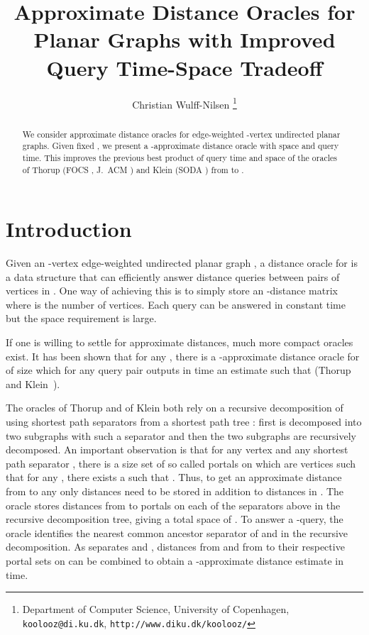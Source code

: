 \documentclass[11pt]{article}
\begin{document}
\title{Approximate Distance Oracles for Planar Graphs with Improved Query Time-Space Tradeoff}
\author{Christian Wulff-Nilsen
        \footnote{Department of Computer Science,
                  University of Copenhagen,
                  \texttt{koolooz@di.ku.dk},
                  \texttt{http://www.diku.dk/koolooz/}}}

\date{}

\maketitle
\begin{abstract}
We consider approximate distance oracles for edge-weighted -vertex undirected planar graphs. Given fixed , we present a -approximate distance oracle with  space and  query time. This improves the previous best product of query time and space of the oracles of Thorup (FOCS , J.~ACM ) and Klein (SODA ) from  to .
\end{abstract}

\section{Introduction}\label{sec:Intro}
Given an -vertex edge-weighted undirected planar graph , a distance oracle for  is a data structure that can efficiently answer distance queries  between pairs of vertices  in . One way of achieving this is to simply store an -distance matrix where  is the number of vertices. Each query can be answered in constant time but the space requirement is large.

If one is willing to settle for approximate distances, much more compact oracles exist. It has been shown that for any , there is a -approximate distance oracle for  of size  which for any query pair  outputs in time  an estimate  such that  (Thorup~\cite{OraclePlanarThorup} and Klein~\cite{OraclePlanarKlein}).

The oracles of Thorup and of Klein both rely on a recursive decomposition of  using shortest path separators from a shortest path tree : first  is decomposed into two subgraphs with such a separator and then the two subgraphs are recursively decomposed. An important observation is that for any vertex  and any shortest path separator , there is a size  set  of so called portals on  which are vertices such that for any , there exists a  such that . Thus, to get an approximate distance from  to any  only  distances  need to be stored in addition to distances in . The oracle stores distances from  to portals on each of the  separators above  in the recursive decomposition tree, giving a total space of . To answer a -query, the oracle identifies the nearest common ancestor separator  of  and  in the recursive decomposition. As  separates  and , distances from  and from  to their respective portal sets on  can be combined to obtain a -approximate distance estimate in  time.
\end{document}
